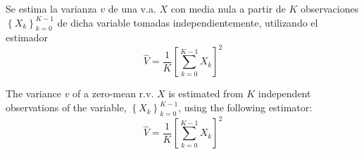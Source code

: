 \ifspanish

\question Se estima la varianza $v$ de una v.a. $X$ con media nula a partir de $K$ observaciones $\left\lbrace X_k \right\rbrace_{k=0}^{K-1} $  de dicha variable tomadas independientemente, utilizando el estimador 
 $$\hat{V}=\frac{1}{K}\left[\sum_{k=0}^{K-1} X_k\right]^2$$ 

\begin{solution}
  \end{solution}

\else

\question The variance $v$ of a zero-mean r.v. $X$ is estimated from $K$ independent observations of the variable, $\left\{ X_k \right\}_{k=0}^{K-1}$, using the following estimator:
$$\hat{V}=\frac{1}{K}\left[\sum_{k=0}^{K-1} X_k\right]^2$$ 

\begin{solution}
\end{solution}

\fi